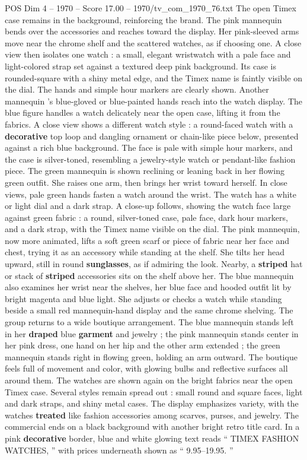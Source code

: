 \begin{textsample}{POS Dim 4 – 1970 – Score 17.00 – 1970/tv\_com\_1970\_76.txt}
The open Timex case remains in the background, reinforcing the brand.
The pink mannequin bends over the accessories and reaches toward the display.
Her pink-sleeved arms move near the chrome shelf and the scattered watches, as if choosing one.
A close view then isolates one watch : a small, elegant wristwatch with a pale face and light-colored strap set against a textured deep pink background.
Its case is rounded-square with a shiny metal edge, and the Timex name is faintly visible on the dial.
The hands and simple hour markers are clearly shown.
Another mannequin ’s blue-gloved or blue-painted hands reach into the watch display.
The blue figure handles a watch delicately near the open case, lifting it from the fabrics.
A close view shows a different watch style : a round-faced watch with a \textbf{decorative} top loop and dangling ornament or chain-like piece below, presented against a rich blue background.
The face is pale with simple hour markers, and the case is silver-toned, resembling a jewelry-style watch or pendant-like fashion piece.
The green mannequin is shown reclining or leaning back in her flowing green outfit.
She raises one arm, then brings her wrist toward herself.
In close views, pale green hands fasten a watch around the wrist.
The watch has a white or light dial and a dark strap.
A close-up follows, showing the watch face large against green fabric : a round, silver-toned case, pale face, dark hour markers, and a dark strap, with the Timex name visible on the dial.
The pink mannequin, now more animated, lifts a soft green scarf or piece of fabric near her face and chest, trying it as an accessory while standing at the shelf.
She tilts her head upward, still in round \textbf{sunglasses}, as if admiring the look.
Nearby, a \textbf{striped} hat or stack of \textbf{striped} accessories sits on the shelf above her.
The blue mannequin also examines her wrist near the shelves, her blue face and hooded outfit lit by bright magenta and blue light.
She adjusts or checks a watch while standing beside a small red mannequin-hand display and the same chrome shelving.
The group returns to a wide boutique arrangement.
The blue mannequin stands left in her \textbf{draped} blue \textbf{garment} and jewelry ; the pink mannequin stands center in her pink dress, one hand on her hip and the other arm extended ; the green mannequin stands right in flowing green, holding an arm outward.
The boutique feels full of movement and color, with glowing bulbs and reflective surfaces all around them.
The watches are shown again on the bright fabrics near the open Timex case.
Several styles remain spread out : small round and square faces, light and dark straps, and shiny metal cases.
The display emphasizes variety, with the watches \textbf{treated} like fashion accessories among scarves, purses, and jewelry.
The commercial ends on a black background with another bright retro title card.
In a pink \textbf{decorative} border, blue and white glowing text reads “ TIMEX FASHION WATCHES, ” with prices underneath shown as “ 9.95–19.95. ”

\end{textsample}
